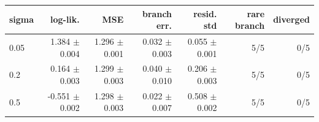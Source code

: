 \begin{tabular}{lrrrrrr}
\toprule
sigma & log-lik. & MSE & branch err. & resid. std & rare branch & diverged \\
\midrule
0.05 & 1.384 $\pm$ 0.004 & 1.296 $\pm$ 0.001 & 0.032 $\pm$ 0.003 & 0.055 $\pm$ 0.001 & 5/5 & 0/5 \\
0.2 & 0.164 $\pm$ 0.003 & 1.299 $\pm$ 0.003 & 0.040 $\pm$ 0.010 & 0.206 $\pm$ 0.003 & 5/5 & 0/5 \\
0.5 & -0.551 $\pm$ 0.002 & 1.298 $\pm$ 0.003 & 0.022 $\pm$ 0.007 & 0.508 $\pm$ 0.002 & 5/5 & 0/5 \\
\bottomrule
\end{tabular}
